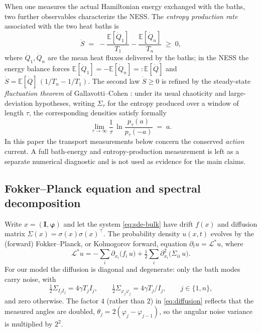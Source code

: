\documentclass[11pt,a4paper]{article}
\theoremstyle{definition}
\newcommand{\E}{\mathbb{E}}
\numberwithin{equation}{section}   %
\newcommand{\bI}{\mathbf{I}}
\newcommand{\bphi}{\boldsymbol{\varphi}}
\newcommand{\Ladj}{\mathcal{L}^{*}}
\begin{document}
When one measures the actual Hamiltonian energy exchanged with the baths, two
further observables characterize the NESS. The \emph{entropy production rate}
associated with the two heat baths is
\begin{equation}\label{eq:entropy-prod}
  \dot S \;=\; -\frac{\E[\dot Q_1]}{T_1} - \frac{\E[\dot Q_n]}{T_n} \;\ge\; 0,
\end{equation}
where $\dot Q_1,\dot Q_n$ are the mean heat fluxes delivered by the baths; in
the NESS the energy balance forces $\E[\dot Q_1]=-\E[\dot Q_n]=:\E[\dot Q]$ and
$\dot S = \E[\dot Q]\,(1/T_n - 1/T_1)$. The second law $\dot S\ge 0$ is refined
by the steady-state \emph{fluctuation theorem} of Gallavotti--Cohen
\cite{GallavottiCohen}: under its usual chaoticity and large-deviation
hypotheses, writing $\Sigma_\tau$ for the entropy produced over a window of
length $\tau$, the corresponding densities satisfy formally
\begin{equation}\label{eq:ft}
  \lim_{\tau\to\infty}\frac{1}{\tau}\,
  \ln\frac{p_\tau(a)}{p_\tau(-a)} \;=\; a .
\end{equation}
In this paper the transport measurements below concern the conserved
\emph{action} current. A full bath-energy and entropy-production measurement is
left as a separate numerical diagnostic and is not used as evidence for the main claims.

\subsection{Fokker--Planck equation and spectral decomposition}\label{sec:fp}

Write $x=(\bI,\bphi)$ and let the system \eqref{eq:sde-bulk} have drift $f(x)$
and diffusion matrix $\Sigma(x)=\sigma(x)\sigma(x)^{\!\top}$. The probability
density $u(x,t)$ evolves by the (forward) Fokker--Planck, or Kolmogorov forward,
equation $\partial_t u = \Ladj u$, where
\begin{equation}\label{eq:fp-operator}
  \Ladj u = -\sum_i \partial_{x_i}\!\big(f_i\,u\big)
            + \tfrac12\sum_{i} \partial^{2}_{x_i}\!\big(\Sigma_{ii}\,u\big).
\end{equation}
For our model the diffusion is diagonal and degenerate: only the bath modes
carry noise, with
\begin{equation}\label{eq:diffusion}
  \tfrac12\Sigma_{I_j I_j} = 4\gamma T_j I_j, \qquad
  \tfrac12\Sigma_{\varphi_j\varphi_j} = 4\gamma T_j/I_j,
  \qquad j\in\{1,n\},
\end{equation}
and zero otherwise. The factor $4$ (rather than $2$) in \eqref{eq:diffusion}
reflects that the measured angles are doubled, $\theta_j = 2(\varphi_j -
\varphi_{j-1})$, so the angular noise variance is multiplied by $2^2$.
\end{document}
